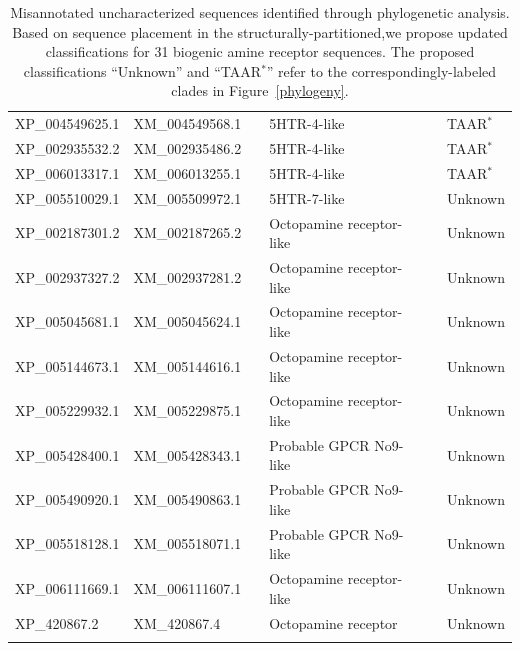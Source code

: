 \documentclass[fleqn,10pt]{wlpeerj}
\begin{document}
\begin{table}[htbp]
\begin{tabular}{l l l l l l}
		XP\_004549625.1 & XM\_004549568.1 & \qquad \qquad & 5HTR-4-like & \qquad \qquad & TAAR$^\ast$ \\
		XP\_002935532.2 & XM\_002935486.2 & \qquad \qquad & 5HTR-4-like & \qquad \qquad & TAAR$^\ast$ \\
		XP\_006013317.1 & XM\_006013255.1 & \qquad \qquad & 5HTR-4-like & \qquad \qquad & TAAR$^\ast$ \\	
		XP\_005510029.1 & XM\_005509972.1 & \qquad \qquad & 5HTR-7-like & \qquad \qquad & Unknown \\
		XP\_002187301.2 & XM\_002187265.2 & \qquad \qquad & Octopamine receptor-like & \qquad \qquad & Unknown \\
		XP\_002937327.2 & XM\_002937281.2 & \qquad \qquad & Octopamine receptor-like & \qquad \qquad & Unknown \\
		XP\_005045681.1 & XM\_005045624.1 & \qquad \qquad & Octopamine receptor-like & \qquad \qquad & Unknown \\
		XP\_005144673.1 & XM\_005144616.1 & \qquad \qquad & Octopamine receptor-like & \qquad \qquad & Unknown \\
		XP\_005229932.1 & XM\_005229875.1 & \qquad \qquad & Octopamine receptor-like & \qquad \qquad & Unknown \\
		XP\_005428400.1 & XM\_005428343.1 & \qquad \qquad & Probable GPCR No9-like & \qquad \qquad & Unknown \\
		XP\_005490920.1 & XM\_005490863.1 & \qquad \qquad & Probable GPCR No9-like & \qquad \qquad & Unknown \\
		XP\_005518128.1 & XM\_005518071.1 & \qquad \qquad & Probable GPCR No9-like & \qquad \qquad & Unknown \\
		XP\_006111669.1 & XM\_006111607.1 & \qquad \qquad & Octopamine receptor-like & \qquad \qquad & Unknown \\
		XP\_420867.2 & XM\_420867.4 & \qquad \qquad & Octopamine receptor & \qquad \qquad & Unknown \\
		\noalign{\smallskip}\hline\noalign{\smallskip} 
	\end{tabular}
	\caption{\label{tab:classif} Misannotated uncharacterized sequences identified through phylogenetic analysis. Based on sequence placement in the structurally-partitioned,we propose updated classifications for 31 biogenic amine receptor sequences. The proposed classifications ``Unknown'' and ``TAAR$^\ast$'' refer to the correspondingly-labeled clades in Figure~\ref{phylogeny}.}
\end{table}

\newpage
\end{document}
